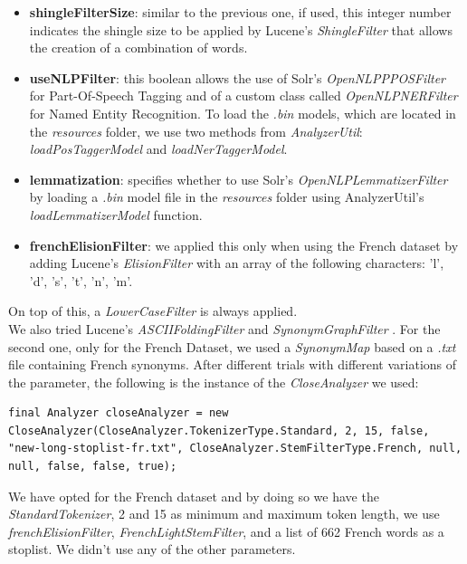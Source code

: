 \begin{itemize}
  \item \textbf{shingleFilterSize}: similar to the previous one, if used, this integer number indicates the shingle size to be applied by Lucene's \textit{ShingleFilter} \cite{luceneshinglefilter} that allows the creation of a combination of words.
  
  \item \textbf{useNLPFilter}: this boolean allows the use of Solr's \cite{solr} \textit{OpenNLPPPOSFilter} \cite{solropennlpposfilter} for Part-Of-Speech Tagging and of a custom class called \textit{OpenNLPNERFilter} for Named Entity Recognition. 
  To load the \textit{.bin} models, which are located in the \textit{resources} folder, we use two methods from \textit{AnalyzerUtil}: \textit{loadPosTaggerModel} and \textit{loadNerTaggerModel}.
  
  \item \textbf{lemmatization}: specifies whether to use Solr's \textit{OpenNLPLemmatizerFilter} \cite{solropennlplemmafilter} by loading a \textit{.bin} model file in the \textit{resources} folder using AnalyzerUtil's \textit{loadLemmatizerModel} function.
  
  \item \textbf{frenchElisionFilter}: we applied this only when using the French dataset by adding Lucene's \textit{ElisionFilter} \cite{luceneelisionfilter} with an array of the following characters: 'l', 'd', 's', 't', 'n', 'm'.
\end{itemize}
On top of this, a \textit{LowerCaseFilter} \cite{lucenelowercasefilter} is always applied. \\
We also tried Lucene's \textit{ASCIIFoldingFilter} \cite{luceneasciifoldingfilter} and \textit{SynonymGraphFilter} \cite{lucenesynonymgraphfilter}. 
For the second one, only for the French Dataset, we used a \textit{SynonymMap} \cite{lucenesynonymmap} based on a \textit{.txt} file containing French synonyms.
\newline
After different trials with different variations of the parameter, the following is the instance of the \textit{CloseAnalyzer} we used:

\begin{lstlisting}
final Analyzer closeAnalyzer = new CloseAnalyzer(CloseAnalyzer.TokenizerType.Standard, 2, 15, false, "new-long-stoplist-fr.txt", CloseAnalyzer.StemFilterType.French, null, null, false, false, true);
\end{lstlisting}
We have opted for the French dataset and by doing so we have the \textit{StandardTokenizer}, 2 and 15 as minimum and maximum token length, we use \textit{frenchElisionFilter}, \textit{FrenchLightStemFilter}, and a list of 662 French words as a stoplist. 
We didn't use any of the other parameters.


